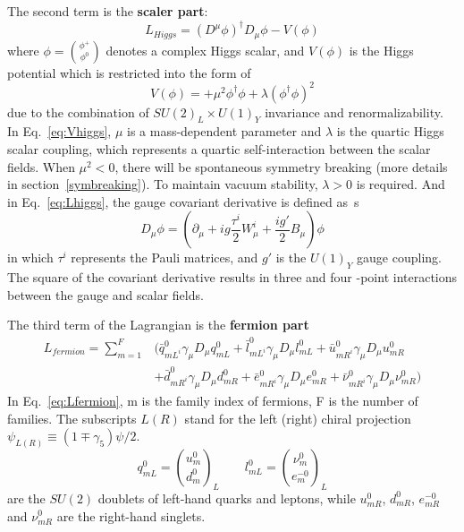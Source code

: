 The second term is the \textbf{scaler part}:
\begin{equation} \label{eq:Lhiggs}
	{L}_{Higgs} = \left(D^{\mu}\phi\right)^{\dagger}D_{\mu}\phi - V(\phi)
\end{equation}
where $\phi = \binom{\phi^{+}}{\phi^{0}}$ denotes a complex Higgs scalar,
and $V(\phi)$ is the Higgs potential which is restricted into the form of 
\begin{equation} \label{eq:Vhiggs}
	V(\phi) = +\mu^{2}\phi^{\dagger}\phi + \lambda\left(\phi^{\dagger}\phi\right)^{2}
\end{equation}
due to the combination of $SU(2)_{L} \times U(1)_{Y}$ invariance and renormalizability.
In Eq.~\ref{eq:Vhiggs}, $\mu$ is a mass-dependent parameter and $\lambda$ is the quartic Higgs scalar coupling, 
which represents a quartic self-interaction between the scalar fields.
When $\mu^{2} < 0$, there will be spontaneous symmetry breaking (more details in section~\ref{symbreaking}).
To maintain vacuum stability, $\lambda > 0$ is required.
And in Eq.~\ref{eq:Lhiggs}, the gauge covariant derivative is defined as~\cite{Langacker:2009my}s
\begin{equation}
	D_{\mu}\phi = \left(\partial_{\mu} +ig\frac{\tau^{i}}{2}W_{\mu}^{i} + \frac{ig'}{2}B_{\mu}\right)\phi
\end{equation}
in which $\tau^{i}$ represents the Pauli matrices, and $g'$ is the $U(1)_{Y}$ gauge coupling.
The square of the covariant derivative results in three and four -point interactions between the gauge and scalar fields.

The third term of the Lagrangian is the \textbf{fermion part}
\begin{equation} \label{eq:Lfermion}
\begin{split}
  	{L}_{fermion} = \sum_{m=1}^{F} & ( \bar{q}_{mL^{i}}^{0}\gamma_{\mu}D_{\mu}q_{mL}^{0} + \bar{l}_{mL^{i}}^{0}\gamma_{\mu}D_{\mu}l_{mL}^{0} + \bar{u}_{mR^{i}}^{0}\gamma_{\mu}D_{\mu}u_{mR}^{0} \\
  	& + \bar{d}_{mR^{i}}^{0}\gamma_{\mu}D_{\mu}d_{mR}^{0} + \bar{e}_{mR^{i}}^{0}\gamma_{\mu}D_{\mu}e_{mR}^{0} + \bar{\nu}_{mR^{i}}^{0}\gamma_{\mu}D_{\mu}\nu_{mR}^{0})
\end{split}
\end{equation} 
In Eq.~\ref{eq:Lfermion}, m is the family index of fermions, F is the number of families.
The subscripts $L (R)$ stand for the left (right) chiral projection $\psi_{L(R)} \equiv \left(1 \mp \gamma_{5} \right) \psi/2$.
\begin{equation}
	q_{mL}^{0} = \binom{u_{m}^{0}}{d_{m}^{0}}_{L}   \qquad    l_{mL}^{0} = \binom{\nu_{m}^{0}}{e_{m}^{-0}}_{L}
\end{equation}
are the $SU(2)$ doublets of left-hand quarks and leptons, while 
$u_{mR}^{0}$, $d_{mR}^{0}$, $e_{mR}^{-0}$ and $\nu_{mR}^{0}$ are the right-hand singlets.

